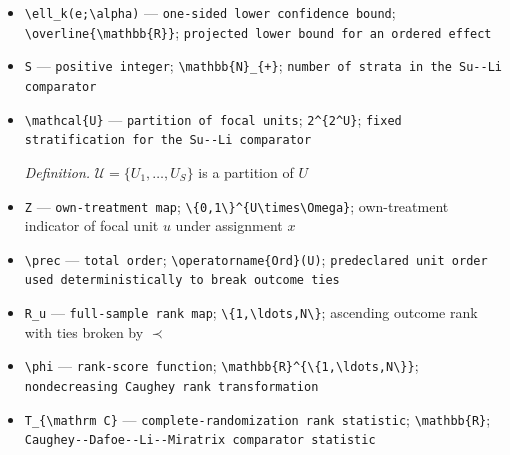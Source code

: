 \documentclass{article}
\begin{document}
\begin{itemize}
  \item \texttt{\textbackslash{}\allowbreak{}ell\_\allowbreak{}k(e;\allowbreak{}\textbackslash{}\allowbreak{}alpha)} --- \texttt{one-\allowbreak{}sided lower confidence bound}; \texttt{\textbackslash{}\allowbreak{}overline\{\textbackslash{}\allowbreak{}mathbb\{R\}\allowbreak{}\}\allowbreak{}}; \texttt{projected lower bound for an ordered effect}
  \item \texttt{S} --- \texttt{positive integer}; \texttt{\textbackslash{}\allowbreak{}mathbb\{N\}\allowbreak{}\_\allowbreak{}\{+\allowbreak{}\}\allowbreak{}}; \texttt{number of strata in the Su-\allowbreak{}-\allowbreak{}Li comparator}
  \item \texttt{\textbackslash{}\allowbreak{}mathcal\{U\}\allowbreak{}} --- \texttt{partition of focal units}; \texttt{2\textasciicircum{}\{2\textasciicircum{}U\}\allowbreak{}}; \texttt{fixed stratification for the Su-\allowbreak{}-\allowbreak{}Li comparator}
  \par\smallskip\noindent\emph{Definition.} \(\mathcal{U}=\{U_1,\ldots,U_S\}\) is a partition of \(U\)
  \item \texttt{Z} --- \texttt{own-\allowbreak{}treatment map}; \texttt{\textbackslash{}\allowbreak{}\{0,\allowbreak{}1\textbackslash{}\allowbreak{}\}\allowbreak{}\textasciicircum{}\{U\textbackslash{}\allowbreak{}times\textbackslash{}\allowbreak{}Omega\}\allowbreak{}}; own-treatment indicator of focal unit \(u\) under assignment \(x\)
  \item \texttt{\textbackslash{}\allowbreak{}prec} --- \texttt{total order}; \texttt{\textbackslash{}\allowbreak{}operatorname\{Ord\}\allowbreak{}(U)}; \texttt{predeclared unit order used deterministically to break outcome ties}
  \item \texttt{R\_\allowbreak{}u} --- \texttt{full-\allowbreak{}sample rank map}; \texttt{\textbackslash{}\allowbreak{}\{1,\allowbreak{}\textbackslash{}\allowbreak{}ldots,\allowbreak{}N\textbackslash{}\allowbreak{}\}\allowbreak{}}; ascending outcome rank with ties broken by \(\prec\)
  \item \texttt{\textbackslash{}\allowbreak{}phi} --- \texttt{rank-\allowbreak{}score function}; \texttt{\textbackslash{}\allowbreak{}mathbb\{R\}\allowbreak{}\textasciicircum{}\{\textbackslash{}\allowbreak{}\{1,\allowbreak{}\textbackslash{}\allowbreak{}ldots,\allowbreak{}N\textbackslash{}\allowbreak{}\}\allowbreak{}\}\allowbreak{}}; \texttt{nondecreasing Caughey rank transformation}
  \item \texttt{T\_\allowbreak{}\{\textbackslash{}\allowbreak{}mathrm C\}\allowbreak{}} --- \texttt{complete-\allowbreak{}randomization rank statistic}; \texttt{\textbackslash{}\allowbreak{}mathbb\{R\}\allowbreak{}}; \texttt{Caughey-\allowbreak{}-\allowbreak{}Dafoe-\allowbreak{}-\allowbreak{}Li-\allowbreak{}-\allowbreak{}Miratrix comparator statistic}

\end{itemize}
\end{document}

